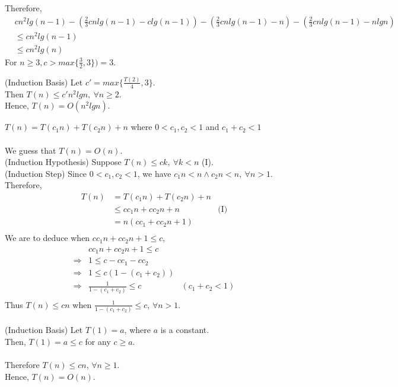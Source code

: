 \documentclass[12pt]{article}
\newenvironment{lemma}[2][Lemma]{\begin{trivlist}
\item[\hskip \labelsep {\bfseries #1}\hskip \labelsep {\bfseries #2.}]}{\end{trivlist}}
\newenvironment{question}[2][Question]{\begin{trivlist}
\item[\hskip \labelsep {\bfseries #1}\hskip \labelsep {\bfseries #2.}]}{\end{trivlist}}
\begin{document}
\begin{question}{1 (b)}
\begin{lemma}{1.6}
    Therefore,
    \begin{align*}
      & cn^{2}lg(n-1) - (\frac{2}{3}cnlg(n-1) - clg(n-1)) - (\frac{2}{3}cnlg(n-1) - n) - (\frac{2}{3}cnlg(n-1) - nlgn) &\\
      & \leq cn^{2}lg(n-1) & \\
      & \leq cn^{2}lg(n) &
    \end{align*}
    For $n \geq 3, c > max\{\frac{3}{2}, 3\}) = 3$.

    (Induction Basis) Let $c' = max\{\frac{T(2)}{4}, 3\}$.\\
    Then $T(n) \leq c'n^{2}lgn,\ \forall n \geq 2$. \\
    Hence, $T(n) = O(n^{2}lgn)$.
  \end{lemma}
\end{question}

\begin{question}{2} $T(n) = T(c_{1}n) + T(c_{2}n) + n$ where $ 0 < c_{1}, c_{2} < 1$ and $c_{1} + c_{2} < 1$
  \leavevmode \\ \\
  We guess that $T(n) = O(n)$. \\
  (Induction Hypothesis) Suppose $T(n) \leq ck,\ \forall k < n$ (I). \\
  (Induction Step) Since $0 < c_{1}, c_{2} < 1$, we have $c_{1}n < n \land c_{2}n < n,\ \forall n > 1$.
  Therefore,
  \begin{align*}
    T(n) & = T(c_{1}n) + T(c_{2}n) + n & \\
         & \leq cc_{1}n + cc_{2}n + n & \text{(I)} \\
         & = n(cc_{1} + cc_{2}n + 1) & \\
  \end{align*}
  We are to deduce when $cc_{1}n + cc_{2}n + 1 \leq c$,
  \begin{align*}
    & cc_{1} n + cc_{2}n + 1 \leq c & \\
    \Rightarrow & 1 \leq c - cc_{1} - cc_{2} &\\
    \Rightarrow & 1 \leq c(1 - (c_{1} + c_{2})) &\\
    \Rightarrow & \frac{1}{1 - (c_{1} + c_{2})} \leq c & (c_{1} + c_{2} < 1)\\
  \end{align*}
  Thus $T(n) \leq cn$ when $\frac{1}{1 - (c_{1} + c_{2})} \leq c$, $\forall n > 1$. \\ \\
  (Induction Basis) Let $T(1) = a$, where $a$ is a constant.\\
  Then, $T(1) = a \leq c$ for any $c \geq a$. \\ \\
  Therefore $T(n) \leq cn$, $\forall n \geq 1$.\\
  Hence, $T(n) = O(n)$.
\end{question}
\end{document}
